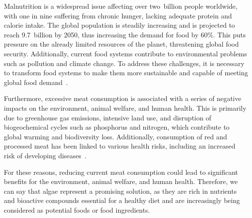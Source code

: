 Malnutrition is a widespread issue affecting over two~billion people worldwide, with one in nine suffering from chronic hunger, lacking adequate protein and calorie intake. The global population is steadily increasing and is projected to reach \num{9,7}~billion by 2050, thus increasing the demand for food by 60\%. This puts pressure on the already limited resources of the planet, threatening global food security. Additionally, current food systems contribute to environmental problems such as pollution and climate change. To address these challenges, it is necessary to transform food systems to make them more sustainable and capable of meeting global food demand~\parencite{hosseinkhani_Key_2022}.

Furthermore, excessive meat consumption is associated with a series of negative impacts on the environment, animal welfare, and human health. This is primarily due to greenhouse gas emissions, intensive land use, and disruption of biogeochemical cycles such as phosphorus and nitrogen, which contribute to global warming and biodiversity loss. Additionally, consumption of red and processed meat has been linked to various health risks, including an increased risk of developing diseases~\parencite{michel_multinational_2021}.

For these reasons, reducing current meat consumption could lead to significant benefits for the environment, animal welfare, and human health. Therefore, we can say that algae represent a promising solution, as they are rich in nutrients and bioactive compounds essential for a healthy diet and are increasingly being considered as potential foods or food ingredients.

